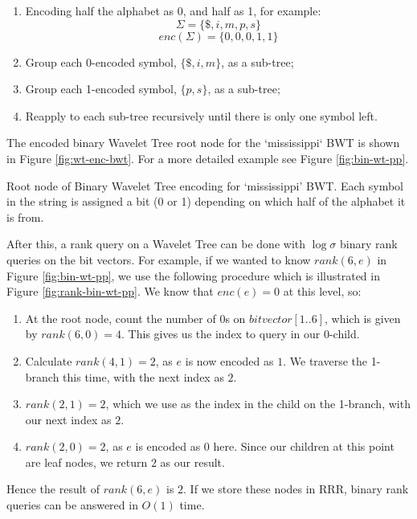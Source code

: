 \begin{enumerate}
    \item
		Encoding half the alphabet as 0, and half as 1, for example:
    		$$\Sigma = \{ \$, i, m, p, s \}$$
			$$enc(\Sigma) = \{ 0, 0, 0, 1, 1 \}$$
    \item
		Group each 0-encoded symbol, $\{ \$, i, m \}$, as a sub-tree;
    \item
		Group each 1-encoded symbol, $\{ p, s \}$, as a sub-tree;
    \item
		Reapply to each sub-tree recursively until there is only one symbol
    	left.
\end{enumerate}

The encoded binary Wavelet Tree root node for the `mississippi` BWT is shown in Figure \ref{fig:wt-enc-bwt}. For a more detailed example see Figure \ref{fig:bin-wt-pp}.


			{Root node of Binary Wavelet Tree encoding for `mississippi' BWT.
			Each symbol in the string is assigned a bit (0 or 1) depending
			on which half of the alphabet it is from.}

After this, a rank query on a Wavelet Tree can be done with $\log \sigma$ binary 
rank queries on the bit vectors. For example, if we wanted to know $rank(6, e)$ 
in Figure \ref{fig:bin-wt-pp}, we use the following procedure which is 
illustrated in Figure \ref{fig:rank-bin-wt-pp}. We know that $enc(e) = 0$ at 
this level, so:

\begin{enumerate}
    \item
		At the root node, count the number of $0$s on $bitvector[1..6]$,
		which is given by $rank(6, 0) = 4$. This gives us the index to query in 
		our 0-child.
    \item
		Calculate $rank(4, 1) = 2$, as $e$ is now encoded as $1$. We traverse
    	the 1-branch this time, with the next index as $2$.
    \item
		$rank(2, 1) = 2$, which we use as the index in the child on the
    	1-branch, with our next index as $2$.
    \item
		$rank(2, 0) = 2$, as $e$ is encoded as $0$ here. Since our children at 
		this point are leaf nodes, we return $2$ as our result.
\end{enumerate}

Hence the result of $rank(6, e)$ is $2$. If we store these nodes in RRR, 
binary rank queries can be answered in $O(1)$ time.

